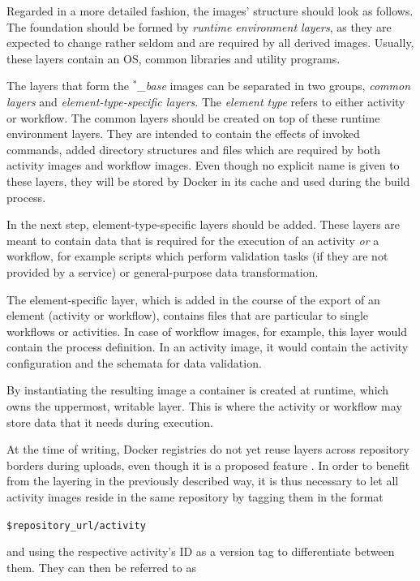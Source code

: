   Regarded in a more detailed fashion, the images' structure should look as follows.
  The foundation should be formed by \emph{runtime environment layers}, as they are expected to change rather seldom and are required by all derived images. Usually, these layers contain an \ac{OS}, common libraries and utility programs.

  The layers that form the \emph{$^*$\_base} images can be separated in two groups, \emph{common layers} and \emph{element-type-specific layers}. The \emph{element type} refers to either activity or workflow.
  The common layers should be created on top of these runtime environment layers. They are intended to contain the effects of invoked commands, added directory structures and files which are required by both activity images and workflow images. Even though no explicit name is given to these layers, they will be stored by Docker in its cache and used during the build process.

  In the next step, element-type-specific layers should be added. These layers are meant to contain data that is required for the execution of an activity \emph{or} a workflow, for example scripts which perform validation tasks (if they are not provided by a service) or general-purpose data transformation.

  The element-specific layer, which is added in the course of the export of an element (activity or workflow), contains files that are particular to single workflows or activities. In case of workflow images, for example, this layer would contain the process definition. In an activity image, it would contain the activity configuration and the schemata for data validation.

  By instantiating the resulting image a container is created at runtime, which owns the uppermost, writable layer. This is where the activity or workflow may store data that it needs during execution.

  At the time of writing, Docker registries do not yet reuse layers across repository borders during uploads, even though it is a proposed feature \cite{Mcgowan2015Proposal}. In order to benefit from the layering in the previously described way, it is thus necessary to let all activity images reside in the same repository by tagging them in the format

  \centerline{\texttt{\$repository\_url/activity}}

  and using the respective activity's \ac{ID} as a version tag to differentiate between them. They can then be referred to as

